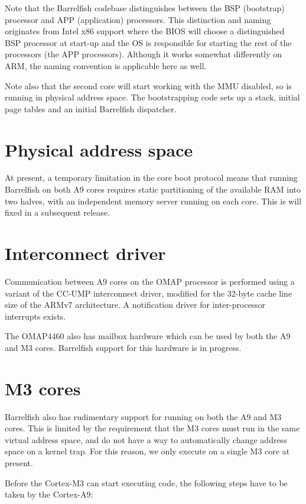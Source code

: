 \documentclass[a4paper,twoside]{report} %
\begin{document}
Note that the Barrelfish codebase distinguishes between the BSP (bootstrap)
processor and APP (application) processors. This distinction and naming
originates from Intel x86 support where the BIOS will choose a
distinguished BSP processor at start-up and the OS 
is responsible for starting the rest of the processors (the APP
processors). Although it works somewhat differently on 
ARM, the naming convention is applicable here as well.

Note also that the second core will start working with the MMU
disabled, so is running in physical address space.  The bootstrapping
code sets up a stack, initial page tables and an initial Barrelfish
dispatcher.

\section{Physical address space}

At present, a temporary limitation in the core boot protocol means
that running Barrelfish on both A9 cores requires static partitioning of
the available RAM into two halves, with an independent memory server
running on each core.   This is will fixed in a subsequent release. 

\section{Interconnect driver}\label{sec:interconnect}

Communication between A9 cores on the OMAP processor is performed
using a variant of the CC-UMP interconnect driver, modified for the
32-byte cache line size of the ARMv7 architecture.  A notification
driver for inter-processor interrupts exists. 

The OMAP4460 also has mailbox hardware which can be used by both the
A9 and M3 cores.  Barrelfish support for this hardware is in
progress. 

\section{M3 cores}

Barrelfish also has rudimentary support for running on both the A9 and
M3 cores.  This is limited by the requirement that the M3 cores must
run in the same virtual address space, and do not have a way to
automatically change address space on a kernel trap.  For this reason,
we only execute on a single M3 core at present. 

Before the Cortex-M3 can start executing code, the following steps
have to be taken by the Cortex-A9:
\end{document}
